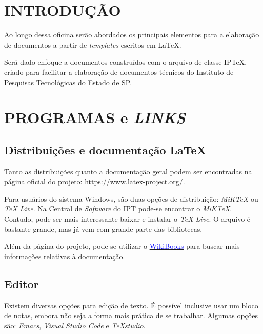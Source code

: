 \documentclass[12pt]{iptex}
\begin{document}
\clearpage

\section{INTRODUÇÃO}
\label{sec:introducao}

Ao longo dessa oficina serão abordados os principais elementos para a elaboração de documentos a partir de \textit{templates} escritos em \LaTeX.

Será dado enfoque a documentos construídos com o arquivo de classe IPTeX, criado para facilitar a elaboração de documentos técnicos do Instituto de Pesquisas Tecnológicas do Estado de SP.

\section{PROGRAMAS e \textit{LINKS}}
\label{sec:programas}

\subsection{Distribuições e documentação \LaTeX}
\label{subsec:distribuicoes}

Tanto as distribuições quanto a documentação geral podem ser encontradas na página oficial do projeto: \textcolor{blue}{\href{https://www.latex-project.org/}{https://www.latex-project.org/}}.

Para usuários do sistema Windows, são duas opções de distribuição: \textit{MiKTeX} ou \textit{TeX Live}. Na Central de \textit{Software} do IPT pode-se encontrar o \textit{MiKTeX}. Contudo, pode ser mais interessante baixar e instalar o \textit{TeX Live}. O arquivo é bastante grande, mas já vem com grande parte das bibliotecas.

Além da página do projeto, pode-se utilizar o \href{https://en.wikibooks.org/wiki/LaTeX}{\textcolor{blue}{WikiBooks}} para buscar mais informações relativas à documentação.

\subsection{Editor}
\label{subsec:editor}

Existem diversas opções para edição de texto. É possível inclusive usar um bloco de notas, embora não seja a forma mais prática de se trabalhar. Algumas opções são: \textcolor{blue}{\href{https://www.gnu.org/software/emacs/}{\textit{Emacs}}}, \textcolor{blue}{\href{https://code.visualstudio.com/}{\textit{Visual Studio Code}}} e \textcolor{blue}{\href{https://www.texstudio.org/}{\textit{TeXstudio}}}.
\end{document}
